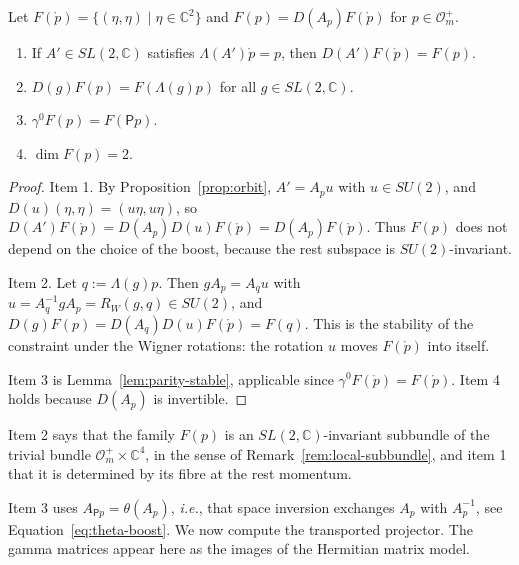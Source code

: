 	\begin{proposition}\label{prop:coherence}
		Let $F(\mathring{p})=\{(\eta,\eta)\mid\eta\in\mathbb{C}^2\}$ and $F(p)=D(A_p)F(\mathring{p})$ for $p\in\mathcal{O}_m^+$.
		\begin{enumerate}
			\item If $A'\in SL(2,\mathbb{C})$ satisfies $\Lambda(A')\mathring{p}=p$, then $D(A')F(\mathring{p})=F(p)$.
			\item $D(g)F(p)=F(\Lambda(g)p)$ for all $g\in SL(2,\mathbb{C})$.
			\item $\gamma^0F(p)=F(\mathsf{P}p)$.
			\item $\dim F(p)=2$.
		\end{enumerate}
	\end{proposition}
	
	\begin{proof}
		Item 1. By Proposition~\ref{prop:orbit}, $A'=A_pu$ with $u\in SU(2)$, and $D(u)(\eta,\eta)=(u\eta,u\eta)$, so $D(A')F(\mathring{p})=D(A_p)D(u)F(\mathring{p})=D(A_p)F(\mathring{p})$. Thus $F(p)$ does not depend on the choice of the boost, because the rest subspace is $SU(2)$-invariant.
		
		Item 2. Let $q:=\Lambda(g)p$. Then $gA_p=A_qu$ with $u=A_q^{-1}gA_p=R_W(g,q)\in SU(2)$, and $D(g)F(p)=D(A_q)D(u)F(\mathring{p})=F(q)$. This is the stability of the constraint under the Wigner rotations: the rotation $u$ moves $F(\mathring{p})$ into itself.
		
		Item 3 is Lemma~\ref{lem:parity-stable}, applicable since $\gamma^0F(\mathring{p})=F(\mathring{p})$. Item 4 holds because $D(A_p)$ is invertible.
	\end{proof}
	
	\noindent Item 2 says that the family $F(p)$ is an $SL(2,\mathbb{C})$-invariant subbundle of the trivial bundle $\mathcal{O}_m^+\times\mathbb{C}^4$, in the sense of Remark~\ref{rem:local-subbundle}, and item 1 that it is determined by its fibre at the rest momentum.
	
	Item 3 uses $A_{\mathsf{P}p}=\theta(A_p)$, \textit{i.e.}, that space inversion exchanges $A_p$ with $A_p^{-1}$, see Equation~\eqref{eq:theta-boost}. We now compute the transported projector. The gamma matrices appear here as the images of the Hermitian matrix model.
	
